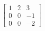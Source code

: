 \documentclass[preview]{standalone}
\begin{document}
\begin{align*}
\begin{bmatrix} 1 & 2 & 3 \\ 0 & 0 & -1 \\ 0 & 0 & -2 \end{bmatrix}
\end{align*}
\end{document}
